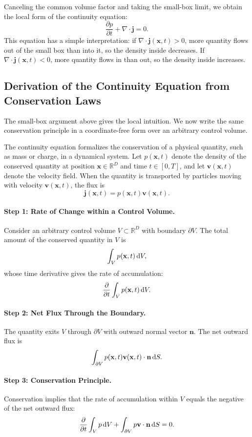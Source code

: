 Canceling the common volume factor and taking the small-box limit, we obtain the local form of the continuity equation:
\[
\frac{\partial p}{\partial t} + \nabla \cdot \mathbf{j} = 0.
\]
This equation has a simple interpretation: if $\nabla\cdot\mathbf{j}(\mathbf{x},t)>0$, more quantity flows out of the small box than into it, so the density inside decreases. If $\nabla\cdot\mathbf{j}(\mathbf{x},t)<0$, more quantity flows in than out, so the density inside increases.


\subsection{Derivation of the Continuity Equation from Conservation Laws}

The small-box argument above gives the local intuition. We now write the same conservation principle in a coordinate-free form over an arbitrary control volume.

The continuity equation formalizes the conservation of a physical quantity, such as mass or charge, in a dynamical system. Let $p(\mathbf{x}, t)$ denote the density of the conserved quantity at position $\mathbf{x} \in \mathbb{R}^D$ and time $t \in [0, T]$, and let $\mathbf{v}(\mathbf{x}, t)$ denote the velocity field. When the quantity is transported by particles moving with velocity $\mathbf{v}(\mathbf{x},t)$, the flux is
\[
\mathbf{j}(\mathbf{x},t)=p(\mathbf{x},t)\mathbf{v}(\mathbf{x},t).
\]

\paragraph{Step 1: Rate of Change within a Control Volume.}  
Consider an arbitrary control volume $V \subset \mathbb{R}^D$ with boundary $\partial V$. The total amount of the conserved quantity in $V$ is
\[
\int_V p(\mathbf{x}, t) \mathop{}\!\mathrm{d} V,
\]
whose time derivative gives the rate of accumulation:
\[
\frac{\partial}{\partial t} \int_V p(\mathbf{x}, t) \mathop{}\!\mathrm{d} V.
\]

\paragraph{Step 2: Net Flux Through the Boundary.}  
The quantity exits $V$ through $\partial V$ with outward normal vector $\mathbf{n}$. The net outward flux is
\[
\int_{\partial V} p(\mathbf{x}, t) \mathbf{v}(\mathbf{x}, t) \cdot \mathbf{n} \mathop{}\!\mathrm{d} S.
\]

\paragraph{Step 3: Conservation Principle.}  
Conservation implies that the rate of accumulation within $V$ equals the negative of the net outward flux:
\[
\frac{\partial}{\partial t} \int_V p \mathop{}\!\mathrm{d} V + \int_{\partial V} p \mathbf{v} \cdot \mathbf{n} \mathop{}\!\mathrm{d} S = 0.
\]

